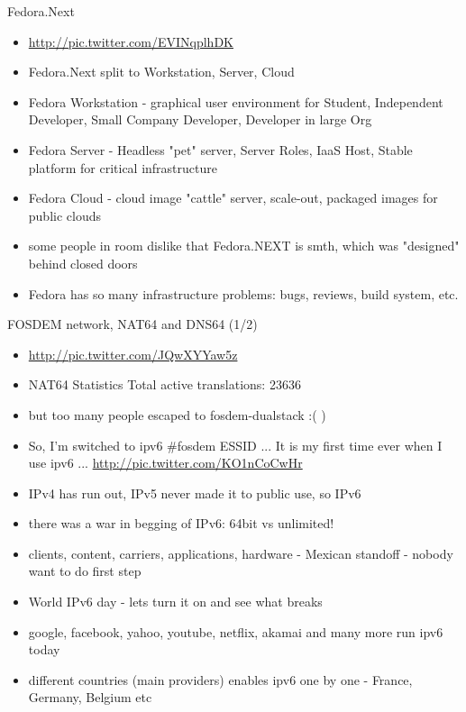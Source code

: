 \documentclass[aspectratio=169]{beamer}
\begin{document}
\begin{frame}{Fedora.Next}
  \begin{itemize}
  \item \url{http://pic.twitter.com/EVINqplhDK}
  \item Fedora.Next split to Workstation, Server, Cloud
  \item Fedora Workstation - graphical user environment for Student, Independent Developer, Small Company Developer, Developer in large Org
  \item Fedora Server - Headless "pet" server, Server Roles, IaaS Host, Stable platform for critical infrastructure
  \item Fedora Cloud - cloud image "cattle" server, scale-out, packaged images for public clouds
  \item some people in room dislike that Fedora.NEXT is smth, which was "designed" behind closed doors
  \item Fedora has so many infrastructure problems: bugs, reviews, build system, etc.
  \end{itemize}
\end{frame}

\begin{frame}{FOSDEM network, NAT64 and DNS64 (1/2)}
  \begin{itemize}
  \item \url{http://pic.twitter.com/JQwXYYaw5z}
  \item NAT64 Statistics Total active translations: 23636 
  \item but too many people escaped to fosdem-dualstack :( )
  \item So, I'm switched to ipv6 \#fosdem ESSID ... It is my first time ever when I use ipv6 ... \url{http://pic.twitter.com/KO1nCoCwHr}
  \item IPv4 has run out, IPv5 never made it to public use, so IPv6
  \item there was a war in begging of IPv6: 64bit vs unlimited!
  \item clients, content, carriers, applications, hardware - Mexican standoff - nobody want to do first step
  \item World IPv6 day - lets turn it on and see what breaks
  \item google, facebook, yahoo, youtube, netflix, akamai and many more run ipv6 today
  \item different countries (main providers) enables ipv6 one by one - France, Germany, Belgium etc
  \end{itemize}
\end{frame}
  
\end{document}
